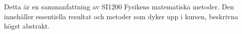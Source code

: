 Detta är en sammanfattning av SI1200 Fysikens matematiska metoder. Den innehåller essentiella resultat och metoder som dyker upp i kursen, beskrivna högst abstrakt.
